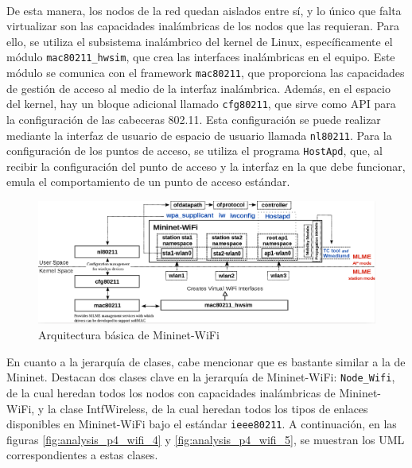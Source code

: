 \\
De esta manera, los nodos de la red quedan aislados entre sí, y lo único que falta virtualizar son las capacidades inalámbricas de los nodos que las requieran. Para ello, se utiliza el subsistema inalámbrico del kernel de Linux, específicamente el módulo \texttt{mac80211\_hwsim}, que crea las interfaces inalámbricas en el equipo. Este módulo se comunica con el framework \texttt{mac80211}, que proporciona las capacidades de gestión de acceso al medio de la interfaz inalámbrica. Además, en el espacio del kernel, hay un bloque adicional llamado \texttt{cfg80211}, que sirve como API para la configuración de las cabeceras 802.11. Esta configuración se puede realizar mediante la interfaz de usuario de espacio de usuario llamada \texttt{nl80211}. Para la configuración de los puntos de acceso, se utiliza el programa \texttt{HostApd}, que, al recibir la configuración del punto de acceso y la interfaz en la que debe funcionar, emula el comportamiento de un punto de acceso estándar.\\

\begin{figure}[ht]
    \centering
    \includegraphics[width=\textwidth]{archivos/img/teoria/mininetwifi.png}
    \caption{Arquitectura básica de Mininet-WiFi \cite{7367387}}
    \label{fig:mininetwifi}
\end{figure}

En cuanto a la jerarquía de clases, cabe mencionar que es bastante similar a la de Mininet. Destacan dos clases clave en la jerarquía de Mininet-WiFi: \texttt{Node\_Wifi}, de la cual heredan todos los nodos con capacidades inalámbricas de Mininet-WiFi, y la clase IntfWireless, de la cual heredan todos los tipos de enlaces disponibles en Mininet-WiFi bajo el estándar \texttt{ieee80211}. A continuación, en las figuras \ref{fig:analysis_p4_wifi_4} y \ref{fig:analysis_p4_wifi_5}, se muestran los UML correspondientes a estas clases.

